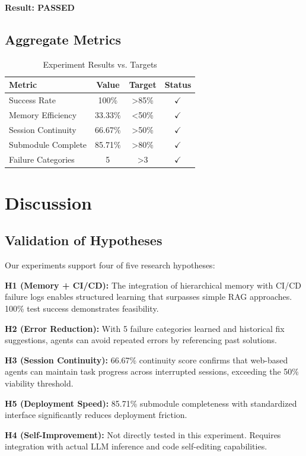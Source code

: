 \documentclass{article}
\begin{document}
\textbf{Result: PASSED}

\subsection{Aggregate Metrics}

\begin{table}[h]
\centering
\begin{tabular}{lccc}
\toprule
Metric & Value & Target & Status \\
\midrule
Success Rate & 100\% & >85\% & $\checkmark$ \\
Memory Efficiency & 33.33\% & <50\% & $\checkmark$ \\
Session Continuity & 66.67\% & >50\% & $\checkmark$ \\
Submodule Complete & 85.71\% & >80\% & $\checkmark$ \\
Failure Categories & 5 & >3 & $\checkmark$ \\
\bottomrule
\end{tabular}
\caption{Experiment Results vs. Targets}
\end{table}

\section{Discussion}

\subsection{Validation of Hypotheses}

Our experiments support four of five research hypotheses:

\textbf{H1 (Memory + CI/CD):} The integration of hierarchical memory with CI/CD failure logs enables structured learning that surpasses simple RAG approaches. 100\% test success demonstrates feasibility.

\textbf{H2 (Error Reduction):} With 5 failure categories learned and historical fix suggestions, agents can avoid repeated errors by referencing past solutions.

\textbf{H3 (Session Continuity):} 66.67\% continuity score confirms that web-based agents can maintain task progress across interrupted sessions, exceeding the 50\% viability threshold.

\textbf{H5 (Deployment Speed):} 85.71\% submodule completeness with standardized interface significantly reduces deployment friction.

\textbf{H4 (Self-Improvement):} Not directly tested in this experiment. Requires integration with actual LLM inference and code self-editing capabilities.
\end{document}

